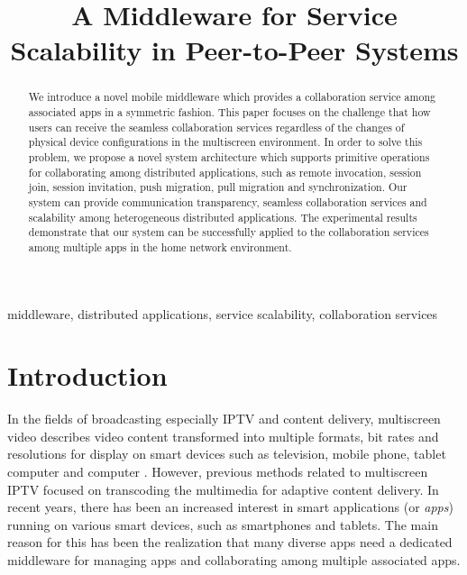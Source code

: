 \documentclass[conference]{IEEEtran}
\begin{document}
    \title{A Middleware for Service Scalability in Peer-to-Peer Systems }

    \author{
    }

    \maketitle

\begin{abstract}
We introduce a novel mobile middleware which provides a collaboration service among associated apps in a symmetric fashion.
This paper focuses on the challenge that how users can  receive the seamless collaboration services regardless of the changes of physical device configurations in the multiscreen environment.
In order to solve this problem, we propose a novel system architecture which supports primitive operations for collaborating among distributed applications, such as remote invocation, session join, session invitation,  push migration, pull migration and synchronization.
Our system can provide communication transparency, seamless collaboration services and scalability among heterogeneous distributed applications.
The experimental results demonstrate that our system can be successfully applied to the collaboration services among multiple apps in the home network environment.
\end{abstract}

    \begin{IEEEkeywords}
    middleware, distributed applications, service scalability, collaboration services
    \end{IEEEkeywords}

\section{Introduction}
In the fields of broadcasting especially IPTV and content delivery, multiscreen video describes video content transformed into multiple formats, bit rates and resolutions for display on smart devices such as television, mobile phone, tablet computer and computer \cite{Lucent2011}.
However, previous methods related to multiscreen IPTV focused on transcoding the multimedia for adaptive content delivery. 
In recent years, there has been an increased interest in smart applications (or \textit{apps}) running on various smart devices, such as smartphones and tablets. 
The main reason for this has been the realization that many diverse apps need a dedicated middleware for managing apps and collaborating among multiple associated apps. 
\end{document}
